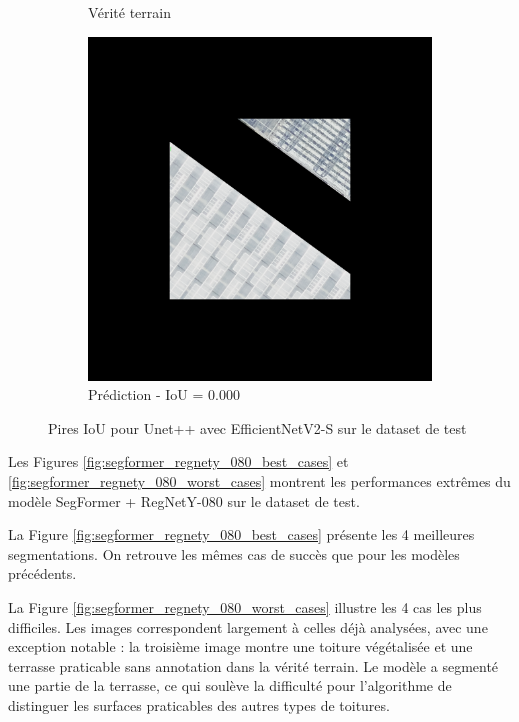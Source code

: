 \begin{figure}[H]
\begin{subfigure}{0.32\textwidth}
    \caption{Vérité terrain}
\end{subfigure}
\hfill
\begin{subfigure}{0.32\textwidth}
    \includegraphics[width=\textwidth]{02-main//figures/ch4/kfold_ensembles/unetplusplus_tu-efficientnetv2_rw_s.ra2_in1k/worst_cases/worst_1_iou0.000_24931113_tile_19_19_52ccbb_overlay_pred.png}
    \caption{Prédiction - IoU = 0.000}
\end{subfigure}

\caption{Pires IoU pour Unet++ avec EfficientNetV2-S sur le dataset de test}
\label{fig:unetplusplus_efficientnetv2_s_worst_cases}
\end{figure}


Les Figures \ref{fig:segformer_regnety_080_best_cases} et \ref{fig:segformer_regnety_080_worst_cases} montrent les performances extrêmes du modèle SegFormer + RegNetY-080 sur le dataset de test.

La Figure \ref{fig:segformer_regnety_080_best_cases} présente les 4 meilleures segmentations. On retrouve les mêmes cas de succès que pour les modèles précédents.

La Figure \ref{fig:segformer_regnety_080_worst_cases} illustre les 4 cas les plus difficiles. Les images correspondent largement à celles déjà analysées, avec une exception notable : la troisième image montre une toiture végétalisée et une terrasse praticable sans annotation dans la vérité terrain. Le modèle a segmenté une partie de la terrasse, ce qui soulève la difficulté pour l'algorithme de distinguer les surfaces praticables des autres types de toitures.

